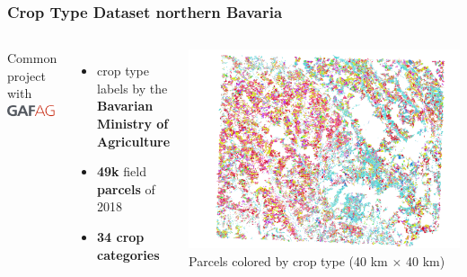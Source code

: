 

\begin{frame}
	\frametitle{Crop Type Dataset northern Bavaria}
	
	\begin{columns}
		\Large
		Common project with \includegraphics[height=5mm]{images/GAF_logo}
		
		\vspace{1em}
		\begin{itemize}
			\item crop type labels by the \\ \textbf{Bavarian Ministry of Agriculture}
			\item \textbf{49k} field \textbf{parcels} of 2018
			\item \textbf{34 crop categories}
		\end{itemize}
		\includegraphics[width=\textwidth]{images/holl}
		\small
		Parcels colored by crop type (40 km $\times$ 40 km)
		
	\end{columns}
	
\end{frame}


